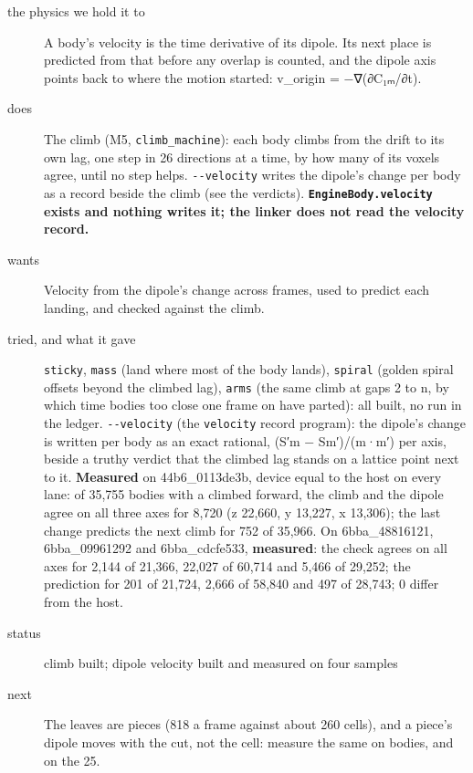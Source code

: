 \begin{description}
\item[{the physics we hold it to}] A body's velocity is the time derivative of its dipole. Its next place is predicted from that before any overlap is counted, and the dipole axis points back to where the motion started: v\_\allowbreak{}origin = −∇(∂C₁ₘ/∂t).
\item[{does}] The climb (M5, \texttt{climb\_\allowbreak{}machine}): each body climbs from the drift to its own lag, one step in 26 directions at a time, by how many of its voxels agree, until no step helps. \texttt{-\allowbreak{}-\allowbreak{}velocity} writes the dipole's change per body as a record beside the climb (see the verdicts). \textbf{\texttt{Engine\allowbreak{}Body.\allowbreak{}velocity} exists and nothing writes it; the linker does not read the velocity record.}
\item[{wants}] Velocity from the dipole's change across frames, used to predict each landing, and checked against the climb.
\item[{tried, and what it gave}] \texttt{sticky}, \texttt{mass} (land where most of the body lands), \texttt{spiral} (golden spiral offsets beyond the climbed lag), \texttt{arms} (the same climb at gaps 2 to n, by which time bodies too close one frame on have parted): all built, no run in the ledger. \texttt{-\allowbreak{}-\allowbreak{}velocity} (the \texttt{velocity} record program): the dipole's change is written per body as an exact rational, (S′m − Sm′)/(m·m′) per axis, beside a truthy verdict that the climbed lag stands on a lattice point next to it. \textbf{Measured} on 44b6\_\allowbreak{}0113de3b, device equal to the host on every lane: of 35,755 bodies with a climbed forward, the climb and the dipole agree on all three axes for 8,720 (z 22,660, y 13,227, x 13,306); the last change predicts the next climb for 752 of 35,966. On 6bba\_\allowbreak{}48816121, 6bba\_\allowbreak{}09961292 and 6bba\_\allowbreak{}cdcfe533, \textbf{measured}: the check agrees on all axes for 2,144 of 21,366, 22,027 of 60,714 and 5,466 of 29,252; the prediction for 201 of 21,724, 2,666 of 58,840 and 497 of 28,743; 0 differ from the host.
\item[{status}] climb built; dipole velocity built and measured on four samples
\item[{next}] The leaves are pieces (818 a frame against about 260 cells), and a piece's dipole moves with the cut, not the cell: measure the same on bodies, and on the 25.
\end{description}

